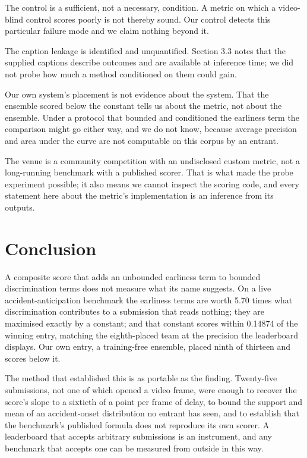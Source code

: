 The control is a sufficient, not a necessary, condition. A metric on which a video-blind control scores poorly is not thereby sound. Our control detects this particular failure mode and we claim nothing beyond it.

The caption leakage is identified and unquantified. Section 3.3 notes that the supplied captions describe outcomes and are available at inference time; we did not probe how much a method conditioned on them could gain.

Our own system's placement is not evidence about the system. That the ensemble scored below the constant tells us about the metric, not about the ensemble. Under a protocol that bounded and conditioned the earliness term the comparison might go either way, and we do not know, because average precision and area under the curve are not computable on this corpus by an entrant.

The venue is a community competition with an undisclosed custom metric, not a long-running benchmark with a published scorer. That is what made the probe experiment possible; it also means we cannot inspect the scoring code, and every statement here about the metric's implementation is an inference from its outputs.


\section{Conclusion}

A composite score that adds an unbounded earliness term to bounded discrimination terms does not measure what its name suggests. On a live accident-anticipation benchmark the earliness terms are worth 5.70 times what discrimination contributes to a submission that reads nothing; they are maximised exactly by a constant; and that constant scores within 0.14874 of the winning entry, matching the eighth-placed team at the precision the leaderboard displays. Our own entry, a training-free ensemble, placed ninth of thirteen and scores below it.

The method that established this is as portable as the finding. Twenty-five submissions, not one of which opened a video frame, were enough to recover the score's slope to a sixtieth of a point per frame of delay, to bound the support and mean of an accident-onset distribution no entrant has seen, and to establish that the benchmark's published formula does not reproduce its own scorer. A leaderboard that accepts arbitrary submissions is an instrument, and any benchmark that accepts one can be measured from outside in this way.

